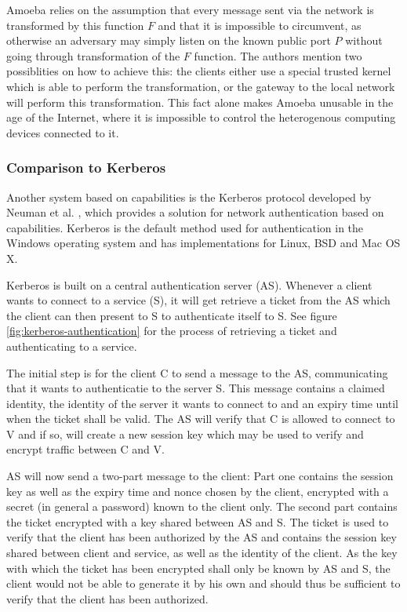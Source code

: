 Amoeba relies on the assumption that every message sent via the network is transformed by this function $F$ and that it is impossible to circumvent, as otherwise an adversary may simply listen on the known public port $P$ without going through transformation of the $F$ function.
The authors mention two possiblities on how to achieve this: the clients either use a special trusted kernel which is able to perform the transformation, or the gateway to the local network will perform this transformation.
This fact alone makes Amoeba unusable in the age of the Internet, where it is impossible to control the heterogenous computing devices connected to it.


\subsubsection{Comparison to Kerberos}

Another system based on capabilities is the Kerberos protocol developed by Neuman et al. \cite{neuman1994kerberos,neuman2005rfc}, which provides a solution for network authentication based on capabilities.
Kerberos is the default method used for authentication in the Windows operating system and has implementations for Linux, BSD and Mac OS X.

Kerberos is built on a central authentication server (AS).
Whenever a client wants to connect to a service (S), it will get retrieve a ticket from the AS which the client can then present to S to authenticate itself to S.
See figure \ref{fig:kerberos-authentication} for the process of retrieving a ticket and authenticating to a service.

The initial step is for the client C to send a message to the AS, communicating that it wants to authenticatie to the server S.
This message contains a claimed identity, the identity of the server it wants to connect to and an expiry time until when the ticket shall be valid.
The AS will verify that C is allowed to connect to V and if so, will create a new session key which may be used to verify and encrypt traffic between C and V.

AS will now send a two-part message to the client:
Part one contains the session key as well as the expiry time and nonce chosen by the client, encrypted with a secret (in general a password) known to the client only.
The second part contains the ticket encrypted with a key shared between AS and S.
The ticket is used to verify that the client has been authorized by the AS and contains the session key shared between client and service, as well as the identity of the client.
As the key with which the ticket has been encrypted shall only be known by AS and S, the client would not be able to generate it by his own and should thus be sufficient to verify that the client has been authorized.

